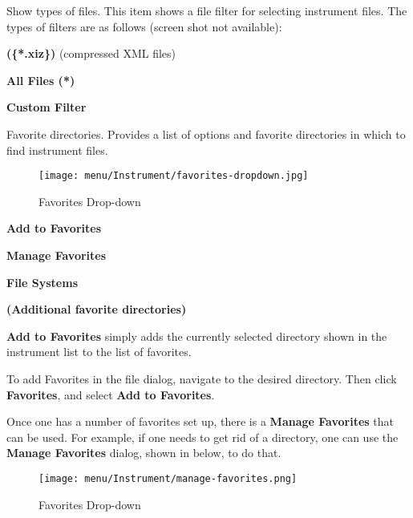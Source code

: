    \setcounter{ItemCounter}{0}      %

   Show types of files.
   This item shows a file filter for selecting instrument files.
   The types of filters are as follows (screen shot not available):

   \begin{enumber}
      \item \textbf{(\{*.xiz\})} (compressed XML files)
      \item \textbf{All Files (*)}
      \item \textbf{Custom Filter}
   \end{enumber}

   Favorite directories.
   Provides a list of options and favorite directories in which to find 
   instrument files.

\begin{figure}[H]
   \centering 
   \texttt{[image: menu/Instrument/favorites-dropdown.jpg]}
   \caption{Favorites Drop-down}
   \label{fig:open_instrument_favorites}
\end{figure}

   \begin{enumber}
      \item \textbf{Add to Favorites}
      \item \textbf{Manage Favorites}
      \item \textbf{File Systems}
      \item \textbf{(Additional favorite directories)}
   \end{enumber}

   \textbf{Add to Favorites}
   simply adds the currently selected directory shown in the instrument list
   to the list of favorites.

   To add Favorites in the file dialog, navigate to the desired directory.
   Then click \textbf{Favorites}, and select \textbf{Add to Favorites}.

   Once one has a number of favorites set up,
   there is a \textbf{Manage Favorites} that can be used.
   For example, if one needs to get rid of a directory, one can use the
   \textbf{Manage Favorites}
   dialog, shown in
    below,
   to do that.

\begin{figure}[H]
   \centering 
   \texttt{[image: menu/Instrument/manage-favorites.png]}
   \caption{Favorites Drop-down}
   \label{fig:manage_instrument_favorites}
\end{figure}

